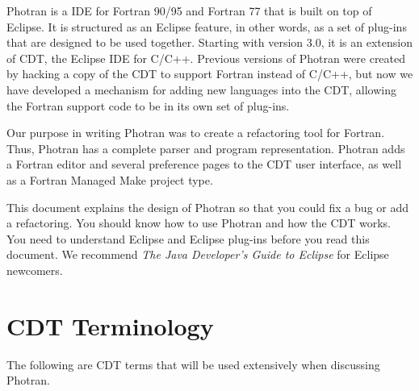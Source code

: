 
Photran is a IDE for Fortran 90/95 and Fortran 77 that is built on top of
Eclipse.  It is structured as an Eclipse feature, in other words,
as a set of plug-ins that are designed to be used together.
Starting with version 3.0, it is an extension of CDT, the Eclipse IDE for
C/C++.  Previous versions of Photran were created by hacking a copy of the
CDT to support Fortran instead of C/C++, but now we have developed a
mechanism for adding new languages into the CDT, allowing the Fortran support
code to be in its own set of plug-ins.

Our purpose in writing Photran was to create a refactoring tool for Fortran.
Thus, Photran has a complete parser and program representation.  Photran
adds a Fortran editor and several preference pages to the CDT user interface,
as well as a Fortran Managed Make project type.

This document explains the design of Photran so that you could fix a bug or
add a refactoring.  You should know how to use Photran and how
the CDT works.  You need to understand Eclipse and Eclipse plug-ins
before you read this document.  We recommend \textit{The Java
Developer's Guide to Eclipse} for Eclipse newcomers.

\section{CDT Terminology}

The following are CDT terms that will be used extensively when discussing
Photran.

